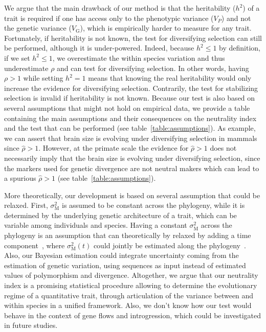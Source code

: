 \documentclass{article}
\newcommand{\Trait}{P}
\newcommand{\Heredity}{h^2}
\newcommand{\VarPhenotype}{V_{\Trait}}
\newcommand{\VarGenetic}{V_{\mathrm{G}}}
\newcommand{\RateMut}{\sigma^2_{\mathrm{M}}}
\newcommand{\NI}{\rho}
\newcommand{\EstNI}{\widehat{\rho}}
\begin{document}
We argue that the main drawback of our method is that the heritability ($\Heredity$) of a trait is required if one has access only to the phenotypic variance ($\VarPhenotype$) and not the genetic variance ($\VarGenetic$), which is empirically harder to measure for any trait.
Fortunately, if heritability is not known, the test for diversifying selection can still be performed, although it is under-powered.
Indeed, because $\Heredity \leq 1$ by definition, if we set $\Heredity \leq 1$, we overestimate the within species variation and thus underestimate $ \NI$ and can test for diversifying selection.
In other words, having $\NI > 1$ while setting $\Heredity = 1$ means that knowing the real heritability would only increase the evidence for diversifying selection.
Contrarily, the test for stabilizing selection is invalid if heritability is not known.
Because our test is also based on several assumptions that might not hold on empirical data, we provide a table containing the main assumptions and their consequences on the neutrality index and the test that can be performed (see table~\ref{table:assumptions}).
As example, we can assert that brain size is evolving under diversifying selection in mammals since $\EstNI > 1$.
However, at the primate scale the evidence for $\EstNI > 1$ does not necessarily imply that the brain size is evolving under diversifying selection, since the markers used for genetic divergence are not neutral makers which can lead to a spurious $\EstNI > 1$ (see table~\ref{table:assumptions}).

More theoretically, our development is based on several assumption that could be relaxed.
First, $\RateMut$ is assumed to be constant across the phylogeny, while it is determined by the underlying genetic architecture of a trait, which can be variable among individuals and species.
Having a constant $\RateMut$ across the phylogeny is an assumption that can theoretically by relaxed by adding a time component~\cite{arnold_understanding_2008, hohenlohe_mipod_2008}, where $\RateMut(t)$ could jointly be estimated along the phylogeny~\cite{kostikova_bridging_2016, gaboriau_multiplatform_2020}.
Also, our Bayesian estimation could integrate uncertainty coming from the estimation of genetic variation, using sequences as input instead of estimated values of polymorphism and divergence.
Altogether, we argue that our neutrality index is a promising statistical procedure allowing to determine the evolutionary regime of a quantitative trait, through articulation of the variance between and within species in a unified framework.
Also, we don't know how our test would behave in the context of gene flows and introgression, which could be investigated in future studies.
\end{document}
